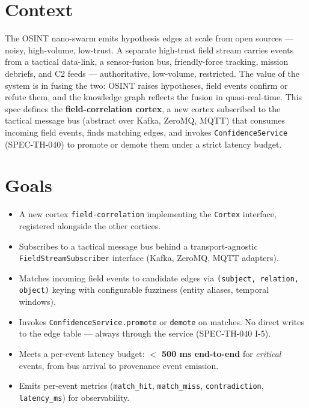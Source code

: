 




\makespecheader

\section{Context}
The OSINT nano-swarm emits hypothesis edges at scale from open sources --- noisy, high-volume, low-trust. A separate high-trust field stream carries events from a tactical data-link, a sensor-fusion bus, friendly-force tracking, mission debriefs, and C2 feeds --- authoritative, low-volume, restricted. The value of the system is in fusing the two: OSINT raises hypotheses, field events confirm or refute them, and the knowledge graph reflects the fusion in quasi-real-time. This spec defines the \textbf{field-correlation cortex}, a new cortex subscribed to the tactical message bus (abstract over Kafka, ZeroMQ, MQTT) that consumes incoming field events, finds matching edges, and invokes \texttt{ConfidenceService} (SPEC-TH-040) to promote or demote them under a strict latency budget.

\section{Goals}
\begin{itemize}[leftmargin=1.2em]
  \item A new cortex \texttt{field-correlation} implementing the \texttt{Cortex} interface, registered alongside the other cortices.
  \item Subscribes to a tactical message bus behind a transport-agnostic \texttt{FieldStreamSubscriber} interface (Kafka, ZeroMQ, MQTT adapters).
  \item Matches incoming field events to candidate edges via \texttt{(subject, relation, object)} keying with configurable fuzziness (entity aliases, temporal windows).
  \item Invokes \texttt{ConfidenceService.promote} or \texttt{demote} on matches. No direct writes to the edge table --- always through the service (SPEC-TH-040 I-5).
  \item Meets a per-event latency budget: \textbf{$<$ 500 ms end-to-end} for \emph{critical} events, from bus arrival to provenance event emission.
  \item Emits per-event metrics (\texttt{match\_hit}, \texttt{match\_miss}, \texttt{contradiction}, \texttt{latency\_ms}) for observability.
\end{itemize}

